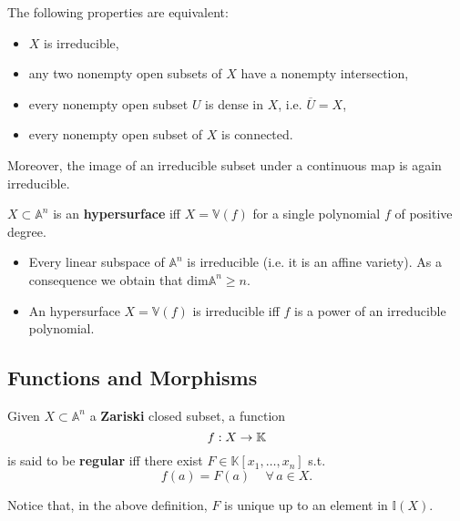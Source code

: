 \begin{rem}
	The following properties are equivalent:
	\begin{itemize}
		\item $X$ is irreducible,
		\item any two nonempty open subsets of $X$ have a nonempty intersection,
		\item every nonempty open subset $U$ is dense in $X$, i.e. $\overline{U} = X$,
		\item every nonempty open subset of $X$ is connected.
	\end{itemize}
	Moreover, the image of an irreducible subset under a continuous map is again irreducible.
\end{rem}

\begin{defn}[Hypersurface]
	$X \subset \mathbb{A}^n$ is an \textbf{hypersurface} iff $X = \mathbb{V}\left( f \right)$ for a single polynomial $f$ of positive degree.
\end{defn}

\begin{ex}\leavevmode\vspace{-.2\baselineskip}
	\begin{itemize}
		\item Every linear subspace of $\mathbb{A}^n$ is irreducible (i.e. it is an affine variety).
			As a consequence we obtain that $\mathrm{dim}\mathbb{A}^n \geq n$.
		\item An hypersurface $X = \mathbb{V}\left( f \right)$ is irreducible iff $f$ is a power of an irreducible polynomial.
	\end{itemize}
\end{ex} 

\subsection{Functions and Morphisms}
\begin{defn}
	Given $X \subset \mathbb{A}^n$ a \textbf{Zariski} closed subset, a function
	\begin{equation}
	f: X \to \mathbb{K}
	\end{equation} 
	is said to be \textbf{regular} iff there exist $F \in \mathbb{K}\left[x_1, \ldots, x_n \right]$ s.t.
	\begin{equation}
		f(a) = F(a) \quad \,\forall\,  a \in X
	.\end{equation} 
\end{defn}
\begin{rem}
	Notice that, in the above definition, $F$ is unique up to an element in $\mathbb{I}(X)$.
\end{rem}

